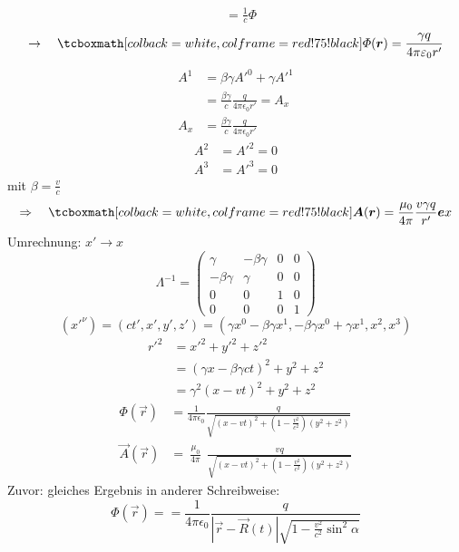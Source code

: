 \begin{enumerate}[1)]
\begin{align*}
	&= \frac{1}{c} \Phi
	\end{align*}
	\begin{equation*}
	\rightarrow \quad \rmbox{\Phi (\vec{r}) = \frac{\gamma q}{4 \pi \epsilon_0 r'}}
	\end{equation*}
	\begin{align*}
	A^{1} &= \beta \gamma A'^{0} + \gamma A'^{1}\\
	&= \frac{\beta \gamma}{c} \frac{q}{4 \pi \epsilon_0 r'} = A_x\\
	A_{x }&=  \frac{\beta \gamma}{c} \frac{q}{4 \pi \epsilon_0 r'}
	\end{align*}
	\begin{align*}
	A^{2} &= A'^{2} = 0\\
	A^{3} &= A'^{3} = 0
	\end{align*}
	mit $ \beta = \frac{v}{c} $
	\begin{equation*}
	\Rightarrow \quad \rmbox{\vec{A}(\vec{r}) = \frac{\mu_0}{4 \pi} \frac{v \gamma q}{r'} \vec{e}x}
	\end{equation*}
	Umrechnung: $ x' \to x $
	\begin{equation*}
	\Lambda^{-1} = \begin{pmatrix}
	\gamma & - \beta \gamma & 0 & 0 \\
	- \beta \gamma & \gamma & 0 & 0 \\
	0 & 0 & 1 & 0 \\
	0 & 0 & 0 & 1
	\end{pmatrix}
	\end{equation*}
	\begin{equation*}
	(x'^{\nu}) = ( ct', x', y', z') = (\gamma x^{0} - \beta \gamma x^{1}, - \beta \gamma x^{0} + \gamma x^{1}, x^{2}, x^{3})
	\end{equation*}
	\begin{align*}
	r'^{2} &= x'^2 + y'^2 + z'^2\\
	&= (\gamma x - \beta \gamma ct)^2 + y^2 + z^2\\
	&= \gamma^2 (x - vt)^2 + y^2 + z^2
	\end{align*}
	\begin{align*}
	\Phi(\vec{r}) &= \frac{1}{4 \pi \epsilon_0}\frac{q}{\sqrt{(x - vt)^2 + (1 - \frac{v^2}{c^2})(y^2 + z^2)}} \\
	\vec{A}(\vec{r}) &= \ \frac{\mu_0}{4 \pi} \ \: \frac{v q}{\sqrt{(x - vt)^2 + (1 - \frac{v^2}{c^2})(y^2 + z^2)}}
	\end{align*}
	Zuvor: gleiches Ergebnis in anderer Schreibweise:
	\begin{equation*}
	\Phi(\vec{r}) = = \frac{1}{4 \pi \epsilon_0} \frac{q}{|\vec{r} - \vec{R}(t)| \sqrt{1 - \frac{v^2}{c^2} \sin^2 \alpha}}
	\end{equation*}
	

\end{enumerate}
